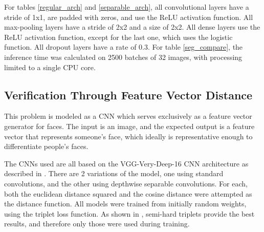 \documentclass[runningheads]{llncs}
\begin{document}
\begin{table}[]
\centering
\caption{Metrics comparison between the best bounding box detection models}
\label{seg_compare}
\end{table}

For tables \ref{regular_arch} and \ref{separable_arch}, all convolutional layers have a stride of 1x1, are padded with zeros, and use the ReLU activation function. All max-pooling layers have a stride of 2x2 and a size of 2x2. All dense layers use the ReLU activation function, except for the last one, which uses the logistic function. All dropout layers have a rate of 0.3. For table \ref{seg_compare}, the inference time was calculated on 2500 batches of 32 images, with processing limited to a single CPU core.

\subsection{Verification Through Feature Vector Distance}

This problem is modeled as a CNN which serves exclusively as a feature vector generator for faces. The input is an image, and the expected output is a feature vector that represents someone's face, which ideally is representative enough to differentiate people's faces.

The CNNs used are all based on the VGG-Very-Deep-16 CNN architecture as described in \cite{Parkhi15}. There are 2 variations of the model, one using standard convolutions, and the other using depthwise separable convolutions. For each, both the euclidean distance squared and the cosine distance were attempted as the distance function. All models were trained from initially random weights, using the triplet loss function. As shown in \cite{schroff2015facenet}, semi-hard triplets provide the best results, and therefore only those were used during training.
\end{document}
